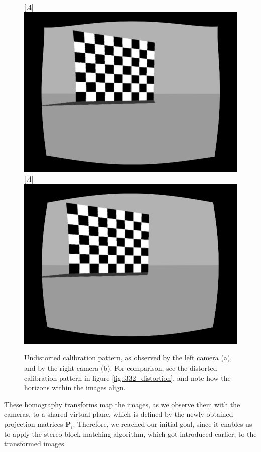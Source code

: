 \begin{figure}[h!]
	\centering
	\captionbox{}%
	[.4\linewidth]{\includegraphics[scale=.2]{chapters/03_principles_of_machine_learning/img/gazebo_rectified_left.jpg}}
	\captionbox{}%
	[.4\linewidth]{\includegraphics[scale=.2]{chapters/03_principles_of_machine_learning/img/gazebo_rectified_right.jpg}}
	\caption{Undistorted calibration pattern, as observed by the left camera (a), and by the right camera (b). For comparison, see the distorted calibration pattern in figure \ref{fig::332_distortion}, and note how the horizons within the images align.}
	\label{fig::332_rectified}
\end{figure}
These homography transforms map the images, as we observe them with the cameras, to a shared virtual plane, which is defined by the newly obtained projection matrices $\bm{P}_i$. Therefore, we reached our initial goal, since it enables us to apply the stereo block matching algorithm, which got introduced earlier, to the transformed images.